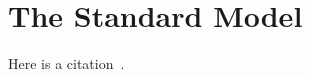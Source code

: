 \chapter[The Standard Model][The Standard Model]{The Standard Model}

Here is a citation~\cite{1999.ATLAS.Physics-TDR}.


